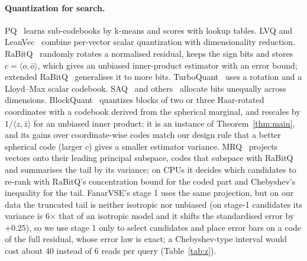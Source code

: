 \documentclass[fleqn,10pt]{wlscirep}
\begin{document}
\paragraph{Quantization for search.} PQ~\cite{jegou2011pq} learns sub-codebooks by k-means and scores with lookup tables. LVQ and LeanVec~\cite{aguerrebere2023lvq,tepper2023leanvec} combine per-vector scalar quantization with dimensionality reduction. RaBitQ~\cite{gao2024rabitq} randomly rotates a normalised residual, keeps the sign bits and stores $c=\langle o,\bar o\rangle$, which gives an unbiased inner-product estimator with an error bound; extended RaBitQ~\cite{gao2025extended} generalises it to more bits. TurboQuant~\cite{zandieh2025turboquant} uses a rotation and a Lloyd--Max scalar codebook. SAQ~\cite{saq2025} and others~\cite{monavec2026,beyonduniform2026} allocate bits unequally across dimensions. BlockQuant~\cite{ann2026blockquant} quantizes blocks of two or three Haar-rotated coordinates with a codebook derived from the spherical marginal, and rescales by $1/\langle z,\bar z\rangle$ for an unbiased inner product; it is an instance of Theorem~\ref{thm:main}, and its gains over coordinate-wise codes match our design rule that a better spherical code (larger $c$) gives a smaller estimator variance. MRQ~\cite{yang2024mrq} projects vectors onto their leading principal subspace, codes that subspace with RaBitQ and summarises the tail by its variance; on CPUs it decides which candidates to re-rank with RaBitQ's concentration bound for the coded part and Chebyshev's inequality for the tail. FanarVSE's stage 1 uses the same projection, but on our data the truncated tail is neither isotropic nor unbiased (on stage-1 candidates its variance is 6$\times$ that of an isotropic model and it shifts the standardised error by $+0.25$), so we use stage 1 only to select candidates and place error bars on a code of the full residual, whose error law is exact; a Chebyshev-type interval would cost about 40 instead of 6 reads per query (Table~\ref{tab:z}).
\end{document}
